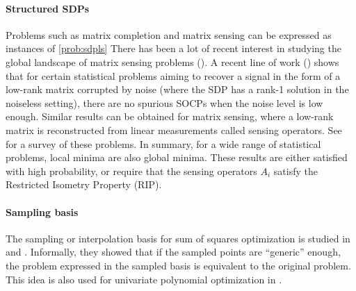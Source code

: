 \documentclass[final,onefignum,onetabnum]{siamart220329}
\begin{document}
\paragraph{Structured SDPs} Problems such as matrix completion and matrix sensing can
  be expressed as instances of \eqref{prob:sdpls} There has been a lot of recent
  interest in studying the global landscape of matrix sensing problems
  (\cite{ge2016matrix,bhojanapalli2016global,ge2017no}). A recent line of work
  (\cite{ge2017no, ge2016matrix, bandeira2016low}) shows that for certain
  statistical problems aiming to recover a signal in the form of a low-rank
  matrix corrupted by noise (where the SDP has a rank-1 solution in the
  noiseless setting), there are no spurious SOCPs when the noise level is low
  enough. Similar results \cite{ge2017no,li2019non,sun2018geometric} can be
  obtained for matrix sensing, where a low-rank matrix is reconstructed from
  linear measurements called sensing operators. See
  \cite{ChiNonconvexOptimizationMeets2019} for a survey of these problems. In
  summary, for a wide range of statistical problems, local minima are also
  global minima. These results are either satisfied with high probability, or
  require that the sensing operators $A_i$ satisfy the Restricted Isometry
  Property (RIP).

\paragraph{Sampling basis} The sampling or interpolation basis for sum of squares
  optimization is studied in \cite{Lofbergcoefficientssamplesnew2004} and
  \cite{CifuentesSamplingalgebraicvarieties2017}. Informally, they showed that
  if the sampled points are ``generic'' enough, the problem expressed in the
  sampled basis is equivalent to the original problem. This idea is also used
  for univariate polynomial optimization in \cite{papp2017univariate,Kapelevich2022}.
\end{document}
